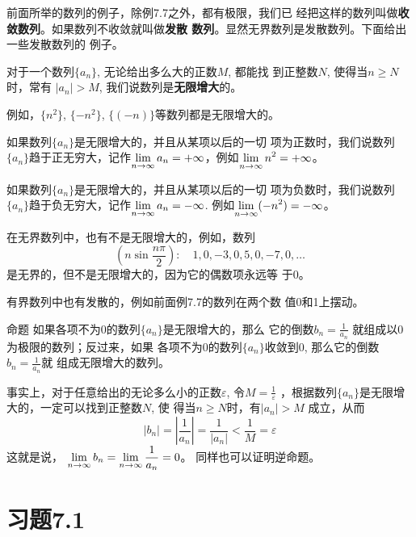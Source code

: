 前面所举的数列的例子，除例7.7之外，都有极限，我们已
经把这样的数列叫做\textbf{收敛数列}。如果数列不收敛就叫做\textbf{发散
数列}。显然无界数列是发散数列。下面给出一些发散数列的
例子。

对于一个数列$\{a_n\}$, 无论给出多么大的正数$M$, 都能找
到正整数$N$, 使得当$n\ge N$时，常有
$|a_n|>M$, 
我们说数列是\textbf{无限增大}的。

例如，$\{n^2\}$, $\{-n^2\}$, $\{(-n)\}$等数列都是无限增大的。

如果数列$\{a_n\}$是无限增大的，并且从某项以后的一切
项为正数时，我们说数列$\{a_n\}$趋于正无穷大，记作$\displaystyle\lim_{n\to\infty}a_n=+\infty$，例如$\displaystyle\lim_{n\to\infty}n^2=+\infty$。

如果数列$\{a_n\}$是无限增大的，并且从某项以后的一切
项为负数时，我们说数列$\{a_n\}$趋于负无穷大，记作$\displaystyle\lim_{n\to\infty}a_n=-\infty$. 例如$\displaystyle\lim_{n\to\infty}(-n^2)=-\infty$。

在无界数列中，也有不是无限增大的，例如，数列
\[\left(n\sin\frac{n\pi}{2}\right):\quad 1,0,-3,0,5,0,-7,0,\ldots\]
是无界的，但不是无限增大的，因为它的偶数项永远等
于0。

有界数列中也有发散的，例如前面例7.7的数列在两个数
值0和1上摆动。

\begin{blk}{命题}
    如果各项不为0的数列$\{a_n\}$是无限增大的，那么
它的倒数$b_n=\frac{1}{a_n}$
就组成以0为极限的数列；反过来，如果
各项不为0的数列$\{a_n\}$收敛到0, 那么它的倒数$b_n=\frac{1}{a_n}$就
组成无限增大的数列。
\end{blk}
 
事实上，对于任意给出的无论多么小的正数$\varepsilon$, 令$M=\frac{1}{\varepsilon}$
，根据数列$\{a_n\}$是无限增大的，一定可以找到正整数$N$, 使
得当$n\ge N$时，有$|a_n|>M$
成立，从而
\[|b_n|=\left|\frac{1}{a_n}\right|=\frac{1}{|a_n|}<\frac{1}{M}=\varepsilon\]
这就是说，
$\displaystyle\lim_{n\to\infty}b_n=\displaystyle\lim_{n\to\infty}\dfrac{1}{a_n}=0$。
同样也可以证明逆命题。

\section*{习题7.1}

